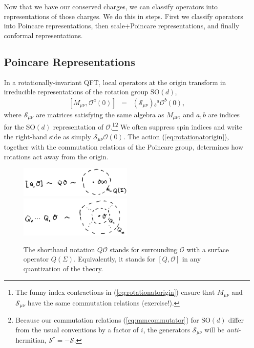 \documentclass[11pt]{ws-rv9x6}
\newcommand\be{\begin{eqnarray}}
\newcommand\ee{\end{eqnarray}}
\newcommand\cO{\mathcal{O}}
\newcommand\<\langle
\renewcommand\>\rangle
\renewcommand\.{\cdot}
\newcommand\SO{\mathrm{SO}}
\newcommand\cS{\mathcal{S}}
\begin{document}
Now that we have our conserved charges, we can classify operators into representations of those charges.  We do this in steps. First we classify operators into Poincare representations, then scale+Poincare representations, and finally conformal representations.

\subsection{Poincare Representations}

In a rotationally-invariant QFT, local operators at the origin transform in irreducible representations of the rotation group $\SO(d)$,
\be
\label{eq:rotationatorigin}
[M_{\mu\nu},\cO^a(0)]&=& (\cS_{\mu\nu}){}_b{}^a\cO^b(0),
\ee
where $\cS_{\mu\nu}$ are matrices satisfying the same algebra as $M_{\mu\nu}$, and $a,b$ are indices for the $\SO(d)$ representation of $\cO$.\footnote{The funny index contractions in (\ref{eq:rotationatorigin}) ensure that $M_{\mu\nu}$ and $\cS_{\mu\nu}$ have the same commutation relations (exercise!).}\footnote{Because our commutation relations (\ref{eq:mmcommutator}) for $\SO(d)$ differ from the usual conventions by a factor of $i$, the generators $\cS_{\mu\nu}$ will be {\it anti-}hermitian, $\cS^\dag=-\cS$.}  We often suppress spin indices and write the right-hand side as simply $\cS_{\mu\nu}\cO(0)$. The action (\ref{eq:rotationatorigin}), together with the commutation relations of the Poincare group, determines how rotations act away from the origin.

\begin{figure}
\begin{center}
\includegraphics[width=0.5\textwidth]{commutatorissurround.jpg}
\includegraphics[width=0.5\textwidth]{surroundmany.jpg}
\end{center}
\caption{The shorthand notation $Q\cO$ stands for surrounding $\cO$ with a surface operator $Q(\Sigma)$. Equivalently, it stands for $[Q,\cO]$ in any quantization of the theory. \label{fig:commutatorissurround}}
\end{figure}
\end{document}
